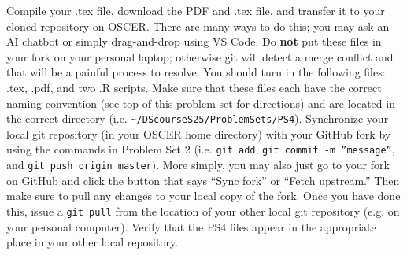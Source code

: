 \documentclass[12pt,english]{exam}
\begin{document}
\begin{questions}
\question Compile your .tex file, download the PDF and .tex file, and transfer it to your cloned repository on OSCER. There are many ways to do this;  you may ask an AI chatbot or simply drag-and-drop using VS Code. Do \textbf{not} put these files in your fork on your personal laptop; otherwise git will detect a merge conflict and that will be a painful process to resolve.
\question You should turn in the following files: .tex, .pdf,  and two .R scripts.  Make sure that these files each have the correct naming convention (see top of this problem set for directions) and are located in the correct directory (i.e. \texttt{\textasciitilde/DScourseS25/ProblemSets/PS4}).
\question Synchronize your local git repository (in your OSCER home directory) with your GitHub fork by using the commands in Problem Set 2 (i.e. \texttt{git add}, \texttt{git commit -m ''message''}, and \texttt{git push origin master}). More simply, you may also just go to your fork on GitHub and click the button that says ``Sync fork'' or ``Fetch upstream.'' Then make sure to pull any changes to your local copy of the fork. Once you have done this, issue a \texttt{git pull} from the location of your other local git repository (e.g. on your personal computer). Verify that the PS4 files appear in the appropriate place in your other local repository.
\end{questions}
\end{document}
